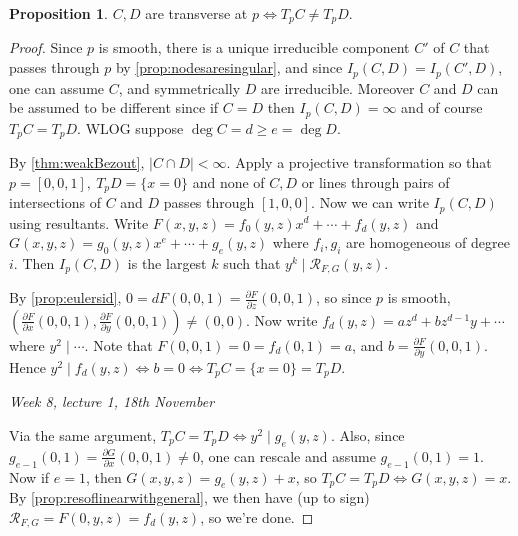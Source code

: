 \documentclass{article}
\newcommand{\re}{\mathcal{R}}
\theoremstyle{definition}
\newtheorem{prop}[defn]{Proposition}
\begin{document}
\begin{prop}
\label{prop:transviffTpCdiffTpD}
$C,D$ are transverse at $p\iff T_pC\neq T_pD$.
\end{prop}
\begin{proof}
Since $p$ is smooth, there is a unique irreducible component $C'$ of $C$ that passes through $p$ by \ref{prop:nodesaresingular}, and since $I_p(C,D)=I_p(C',D)$, one can assume $C$, and symmetrically $D$ are irreducible. Moreover $C$ and $D$ can be assumed to be different since if $C=D$ then $I_p(C,D)=\infty$ and of course $T_pC=T_pD$. WLOG suppose $\deg C=d\geq e=\deg D$.

By \ref{thm:weakBezout}, $|C\cap D|<\infty$. Apply a projective transformation so that $p=[0,0,1],\ T_pD=\{x=0\}$ and none of $C,D$ or lines through pairs of intersections of $C$ and $D$ passes through $[1,0,0]$. Now we can write $I_p(C,D)$ using resultants. Write $F(x,y,z)=f_0(y,z)x^d+\cdots+f_d(y,z)$ and $G(x,y,z)=g_0(y,z)x^e+\cdots+g_e(y,z)$ where $f_i,g_i$ are homogeneous of degree $i$. Then $I_p(C,D)$ is the largest $k$ such that $y^k\mid\re_{F,G}(y,z)$.

By \ref{prop:eulersid}, $0=dF(0,0,1)=\frac{\partial F}{\partial z}(0,0,1)$, so since $p$ is smooth, $\left(\frac{\partial F}{\partial x}(0,0,1),\frac{\partial F}{\partial y}(0,0,1)\right)\neq (0,0)$. Now write $f_d(y,z)=az^d+bz^{d-1}y+\cdots$ where $y^2\mid\cdots$. Note that $F(0,0,1)=0=f_d(0,1)=a$, and $b=\frac{\partial F}{\partial y}(0,0,1)$. Hence $y^2\mid f_d(y,z)\iff b=0\iff T_pC=\{x=0\}=T_pD$.

\begin{flushright}
\textit{Week 8, lecture 1, 18th November}
\end{flushright}

Via the same argument, $T_pC=T_pD\iff y^2\mid g_e(y,z)$. Also, since $g_{e-1}(0,1)=\frac{\partial G}{\partial x}(0,0,1)\neq 0$, one can rescale and assume $g_{e-1}(0,1)=1$. Now if $e=1$, then $G(x,y,z)=g_e(y,z)+x$, so $T_pC=T_pD\iff G(x,y,z)=x$. By \ref{prop:resoflinearwithgeneral}, we then have (up to sign) $\re_{F,G}=F(0,y,z)=f_d(y,z)$, so we're done.


\end{proof}
\end{document}
